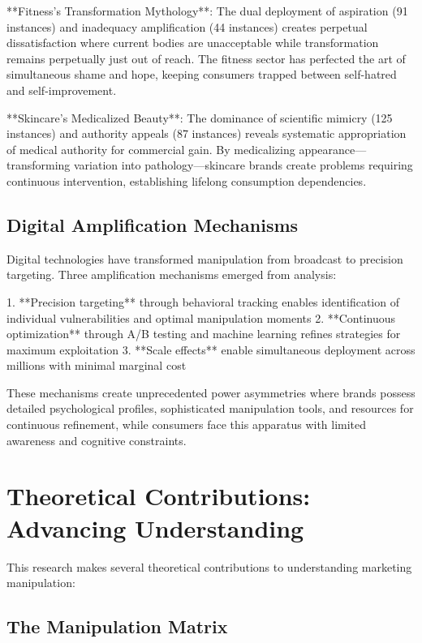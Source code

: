**Fitness's Transformation Mythology**: The dual deployment of aspiration (91 instances) and inadequacy amplification (44 instances) creates perpetual dissatisfaction where current bodies are unacceptable while transformation remains perpetually just out of reach. The fitness sector has perfected the art of simultaneous shame and hope, keeping consumers trapped between self-hatred and self-improvement.

**Skincare's Medicalized Beauty**: The dominance of scientific mimicry (125 instances) and authority appeals (87 instances) reveals systematic appropriation of medical authority for commercial gain. By medicalizing appearance—transforming variation into pathology—skincare brands create problems requiring continuous intervention, establishing lifelong consumption dependencies.

\subsection{Digital Amplification Mechanisms}

Digital technologies have transformed manipulation from broadcast to precision targeting. Three amplification mechanisms emerged from analysis:

1. **Precision targeting** through behavioral tracking enables identification of individual vulnerabilities and optimal manipulation moments
2. **Continuous optimization** through A/B testing and machine learning refines strategies for maximum exploitation
3. **Scale effects** enable simultaneous deployment across millions with minimal marginal cost

These mechanisms create unprecedented power asymmetries where brands possess detailed psychological profiles, sophisticated manipulation tools, and resources for continuous refinement, while consumers face this apparatus with limited awareness and cognitive constraints.

\section{Theoretical Contributions: Advancing Understanding}
\label{sec:theoretical_contributions}

This research makes several theoretical contributions to understanding marketing manipulation:

\subsection{The Manipulation Matrix}

